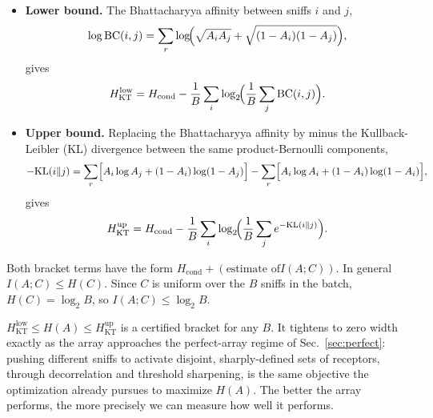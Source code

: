 \documentclass[aps,pre,superscriptaddress,floatfix,longbibliography,linenumbers]{revtex4-2}
\begin{document}
\begin{itemize}
\item \textbf{Lower bound.} The Bhattacharyya affinity between sniffs $i$
and $j$,
\begin{equation}
\log\text{BC}(i,j) = \sum_r \log\!\Bigl(\sqrt{A_iA_j}+\sqrt{(1-A_i)(1-A_j)}\Bigr),
\label{eq:BC}
\end{equation}
gives
\begin{equation}
H_\text{KT}^\text{low} = H_\text{cond} - \frac{1}{B}\sum_i \log_2\!\Bigl(\frac{1}{B}\sum_j \text{BC}(i,j)\Bigr).
\label{eq:KTlow}
\end{equation}
\item \textbf{Upper bound.} Replacing the Bhattacharyya affinity by minus
the Kullback-Leibler (KL) divergence between the same product-Bernoulli
components,
\begin{equation}
-\text{KL}(i\|j) = \sum_r \Bigl[A_i\log A_j + (1-A_i)\log(1-A_j)\Bigr] - \sum_r\Bigl[A_i\log A_i+(1-A_i)\log(1-A_i)\Bigr],
\label{eq:KL}
\end{equation}
gives
\begin{equation}
H_\text{KT}^\text{up} = H_\text{cond} - \frac{1}{B}\sum_i \log_2\!\Bigl(\frac{1}{B}\sum_j e^{-\text{KL}(i\|j)}\Bigr).
\label{eq:KTup}
\end{equation}
\end{itemize}

Both bracket terms have the form $H_\text{cond}+(\text{estimate of
}I(A;C))$. In general $I(A;C)\le H(C)$. Since $C$ is uniform over the $B$
sniffs in the batch, $H(C)=\log_2 B$, so $I(A;C)\le\log_2 B$.

$H_\text{KT}^\text{low} \le H(A) \le H_\text{KT}^\text{up}$ is a certified
bracket for any $B$. It tightens to zero width exactly as the array
approaches the perfect-array regime of Sec.~\ref{sec:perfect}: pushing
different sniffs to activate disjoint, sharply-defined sets of receptors,
through decorrelation and threshold sharpening, is the same objective the
optimization already pursues to maximize $H(A)$. The better the array
performs, the more precisely we can measure how well it performs.



\end{document}
